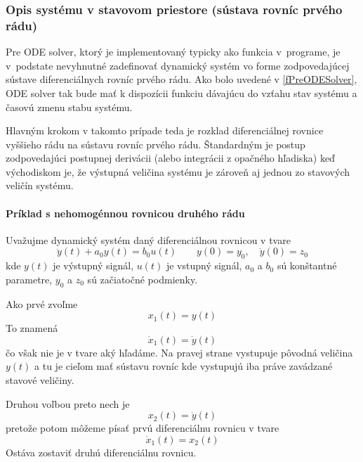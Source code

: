 \documentclass[a4paper, 10pt, ]{article}
\begin{document}
\subsubsection{Opis systému v stavovom priestore (sústava rovníc prvého rádu)}

Pre ODE solver, ktorý je implementovaný typicky ako funkcia v~programe, je v~podstate nevyhnutné zadefinovať dynamický systém vo forme zodpovedajúcej sústave diferenciálnych rovníc prvého rádu. Ako bolo uvedené v \eqref{fPreODESolver}, ODE solver tak bude mať k dispozícii funkciu dávajúcu do vzťahu stav systému a časovú zmenu stabu systému.

Hlavným krokom v takomto prípade teda je rozklad diferenciálnej rovnice vyššieho rádu na sústavu rovníc prvého rádu. Štandardným je postup zodpovedajúci postupnej derivácii (alebo integrácii z opačného hľadiska) keď východiskom je, že výstupná veličina systému je zároveň aj jednou zo stavových veličín systému.


\paragraph{Príklad s nehomogénnou rovnicou druhého rádu}

Uvažujme dynamický systém daný diferenciálnou rovnicou v tvare
\begin{equation} \label{eq:DR2R_2}
    \ddot y(t) + a_0 y(t) = b_0 u(t) \qquad y(0) = y_0, \quad \dot y(0) = z_0
\end{equation}
kde $y(t)$ je výstupný signál, $u(t)$ je vstupný signál, $a_0$ a $b_0$ sú konštantné parametre, $y_0$ a $z_0$ sú začiatočné podmienky. 

Ako prvé zvoľme
\begin{equation} \label{volba1}
    x_1(t) = y(t)
\end{equation}
To znamená
\begin{equation}
    \dot x_1(t) = \dot y(t)
\end{equation}
čo však nie je v tvare aký hľadáme. Na pravej strane vystupuje pôvodná veličina $y(t)$ a tu je cieľom mať sústavu rovníc kde vystupujú iba práve zavádzané stavové veličiny.

Druhou voľbou preto nech je
\begin{equation} \label{volba2}
    x_2(t) = \dot y(t)
\end{equation}
pretože potom môžeme písať prvú diferenciálnu rovnicu v tvare
\begin{equation}
    \dot x_1(t) = x_2(t)
\end{equation}
Ostáva zostaviť druhú diferenciálnu rovnicu. 
\end{document}
